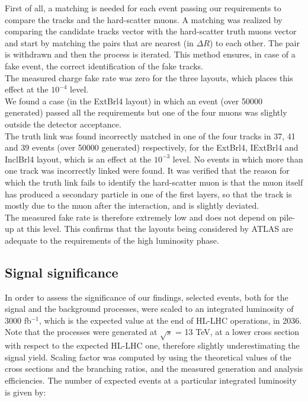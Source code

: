 \documentclass[a4paper,twoside,12pt]{book}
\begin{document}
First of all, a matching is needed for each event passing our requirements to compare 
the tracks and the hard-scatter muons. A matching was realized by comparing the candidate
tracks vector with the hard-scatter truth muons vector and start by matching the pairs
that are nearest (in $\Delta R$) to each other. The pair is withdrawn and then the process
is iterated. This method ensures, in case of a fake event, the correct
identification of the fake tracks. \\

The measured charge fake rate was zero for the three layouts, which places this
effect at the $10^{-4}$ level. \\

We found a case (in the ExtBrl4 layout) 
in which an event (over 50000 generated) passed all the requirements but one of the four muons was slightly outside the detector acceptance.\\

The truth link was found incorrectly matched in one of the
four tracks in 37, 41 and 39 events (over 50000 generated) respectively, for the ExtBrl4, IExtBrl4
and InclBrl4 layout, which is an effect at the $10^{-3}$ level. No events in which more than one
track was incorrectly linked were found.  It was verified that the reason for which 
the truth link fails to identify the hard-scatter muon is that the muon itself has produced
a secondary particle in one of the first layers, so that the track is mostly due to the muon
after the interaction, and is slightly deviated.\\

The measured fake rate is therefore extremely low and does not depend on pile-up at this level.
This confirms that the layouts being considered by ATLAS are adequate to the requirements of the high
luminosity phase.

\subsection*{Signal significance}
In order to assess the significance of our findings, selected events, both for the signal and the background processes, were
scaled to an integrated luminosity of 3000 fb$^{-1}$, which is the expected
value at the end of HL-LHC operations, in 2036. Note that the processes
were generated at $\sqrt{s}$ = 13 TeV, at a lower cross section with respect
to the expected HL-LHC one, therefore slightly underestimating the signal yield. Scaling factor was
computed by using the theoretical values of the cross sections and the branching ratios,
and the measured generation and analysis efficiencies. The number of expected
events at a particular integrated luminosity is given by: 
\end{document}
